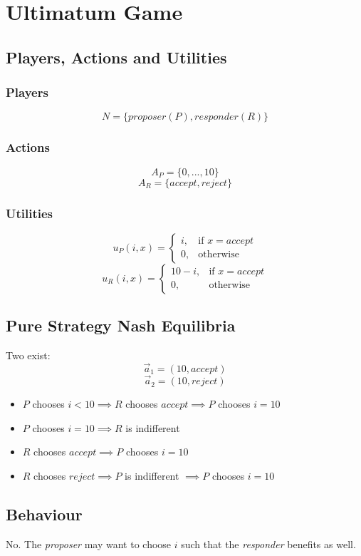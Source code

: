 \newpage
\section{Ultimatum Game}

\subsection{Players, Actions and Utilities}
\subsubsection{Players}
\[N=\{proposer (P), responder (R)\}\]
\subsubsection{Actions}
\[A_P=\{0,...,10\}\]
\[A_R=\{accept, reject\}\]
\subsubsection{Utilities}
\[u_P(i,x) =
    \begin{cases}
        i, & \text{if } x=accept\\
        0, & \text{otherwise}
    \end{cases}
\]
\[u_R(i,x) =
    \begin{cases}
        10-i, & \text{if } x=accept\\
        0, & \text{otherwise}
    \end{cases}
\]

\subsection{Pure Strategy Nash Equilibria}
Two exist:
\[\vec{a}_1=(10,accept)\]
\[\vec{a}_2=(10,reject)\]
\begin{itemize}
    \item $P$ chooses $i<10 \implies R$ chooses $accept \implies P$ chooses $i=10$
    \item $P$ chooses $i=10 \implies R$ is indifferent
    \item $R$ chooses $accept \implies P$ chooses $i=10$
    \item $R$ chooses $reject \implies P$ is indifferent $\implies P$ chooses $i=10$
\end{itemize}

\subsection{Behaviour}
No. The \textit{proposer} may want to choose $i$ such that 
the \textit{responder} benefits as well.
